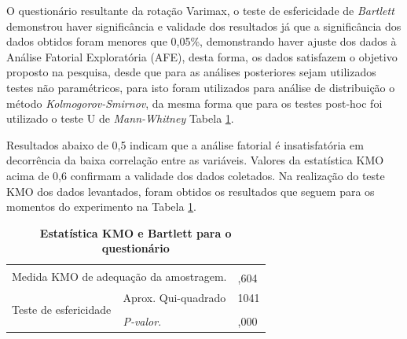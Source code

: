 


O questionário resultante da rotação Varimax, o teste de esfericidade de \textit{Bartlett} demonstrou haver significância e validade dos resultados já que a significância dos dados obtidos foram menores que 0,05\%, demonstrando haver ajuste dos dados à Análise Fatorial Exploratória (AFE), desta forma, os dados satisfazem o objetivo proposto na pesquisa, desde que para as análises posteriores sejam utilizados testes não paramétricos, para isto foram utilizados para análise de distribuição o método \textit{Kolmogorov-Smirnov}, da mesma forma que para os testes post-hoc foi utilizado o teste U de \textit{Mann-Whitney} Tabela \ref{tabela_8}.

Resultados abaixo de 0,5 indicam que a análise fatorial é insatisfatória em decorrência da baixa correlação entre as variáveis. Valores da estatística KMO acima de 0,6 confirmam a validade dos dados coletados. Na realização do teste KMO dos dados levantados, foram obtidos os resultados que seguem para os momentos do experimento na Tabela \ref{tabela_8}.

\begin{table}[H]
\FloatBarrier
\centering
\caption{\textbf{Estatística KMO e Bartlett para o questionário}}
\label{tabela_8}
\begin{tabular}{ll|l}
\hline\hline
\multicolumn{2}{l|}{\multirow{2}{*}{Medida KMO de adequação da amostragem.}} &  \\
\multicolumn{2}{l|}{} & ,604 \\ \hline
\multirow{3}{*}{Teste de esfericidade} & Aprox. Qui-quadrado & 1041 \\
 & \\
 & \textit{P-valor}. & ,000 \\ \hline
\end{tabular}
\end{table}


